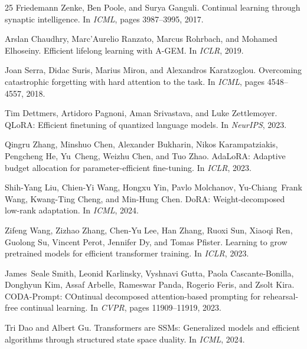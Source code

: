 \documentclass{article}
\begin{document}
\begin{thebibliography}{25}
Friedemann Zenke, Ben Poole, and Surya Ganguli.
\newblock Continual learning through synaptic intelligence.
\newblock In \emph{ICML}, pages 3987--3995, 2017.

Arslan Chaudhry, Marc'Aurelio Ranzato, Marcus Rohrbach, and Mohamed Elhoseiny.
\newblock Efficient lifelong learning with A-GEM.
\newblock In \emph{ICLR}, 2019.

Joan Serra, Didac Suris, Marius Miron, and Alexandros Karatzoglou.
\newblock Overcoming catastrophic forgetting with hard attention to the task.
\newblock In \emph{ICML}, pages 4548--4557, 2018.

Tim Dettmers, Artidoro Pagnoni, Aman Srivastava, and Luke Zettlemoyer.
\newblock QLoRA: Efficient finetuning of quantized language models.
\newblock In \emph{NeurIPS}, 2023.

Qingru Zhang, Minshuo Chen, Alexander Bukharin, Nikos Karampatziakis, Pengcheng He, Yu~Cheng, Weizhu Chen, and Tuo Zhao.
\newblock AdaLoRA: Adaptive budget allocation for parameter-efficient fine-tuning.
\newblock In \emph{ICLR}, 2023.

Shih-Yang Liu, Chien-Yi Wang, Hongxu Yin, Pavlo Molchanov, Yu-Chiang~Frank Wang, Kwang-Ting Cheng, and Min-Hung Chen.
\newblock DoRA: Weight-decomposed low-rank adaptation.
\newblock In \emph{ICML}, 2024.

Zifeng Wang, Zizhao Zhang, Chen-Yu Lee, Han Zhang, Ruoxi Sun, Xiaoqi Ren, Guolong Su, Vincent Perot, Jennifer Dy, and Tomas Pfister.
\newblock Learning to grow pretrained models for efficient transformer training.
\newblock In \emph{ICLR}, 2023.

James~Seale Smith, Leonid Karlinsky, Vyshnavi Gutta, Paola Cascante-Bonilla, Donghyun Kim, Assaf Arbelle, Rameswar Panda, Rogerio Feris, and Zsolt Kira.
\newblock CODA-Prompt: COntinual decomposed attention-based prompting for rehearsal-free continual learning.
\newblock In \emph{CVPR}, pages 11909--11919, 2023.

Tri Dao and Albert Gu.
\newblock Transformers are SSMs: Generalized models and efficient algorithms through structured state space duality.
\newblock In \emph{ICML}, 2024.


\end{thebibliography}
\end{document}
